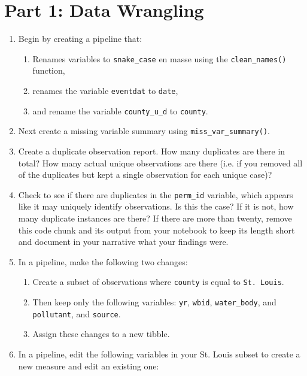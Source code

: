 \documentclass{tufte-handout}
\begin{document}
\section{Part 1: Data Wrangling}
\begin{enumerate}
\item Begin by creating a pipeline that:
\begin{enumerate}
\item Renames variables to \texttt{snake\_case} en masse using the \texttt{clean\_names()} function,
\item renames the variable \texttt{eventdat} to \texttt{date},
\item and rename the variable \texttt{county\_u\_d} to \texttt{county}.
\end{enumerate}
\item Next create a missing variable summary using \texttt{miss\_var\_summary()}.
\item Create a duplicate observation report. How many duplicates are there in total? How many actual unique observations are there (i.e. if you removed all of the duplicates but kept a single observation for each unique case)?
\item Check to see if there are duplicates in the \texttt{perm\_id} variable, which appears like it may uniquely identify observations. Is this the case? If it is not, how many duplicate instances are there? If there are more than twenty, remove this code chunk and its output from your notebook to keep its length short and document in your narrative what your findings were.
\item In a pipeline, make the following two changes:
\begin{enumerate}
\item Create a subset of observations where \texttt{county} is equal to \texttt{St. Louis}. 
\item Then keep only the following variables: \texttt{yr}, \texttt{wbid}, \texttt{water\_body}, and \texttt{pollutant}, and \texttt{source}. 
\item Assign these changes to a new tibble.
\end{enumerate}
\item In a pipeline, edit the following variables in your St. Louis subset to create a new measure and edit an existing one:
\begin{enumerate}

\end{enumerate}
\end{enumerate}
\end{document}
